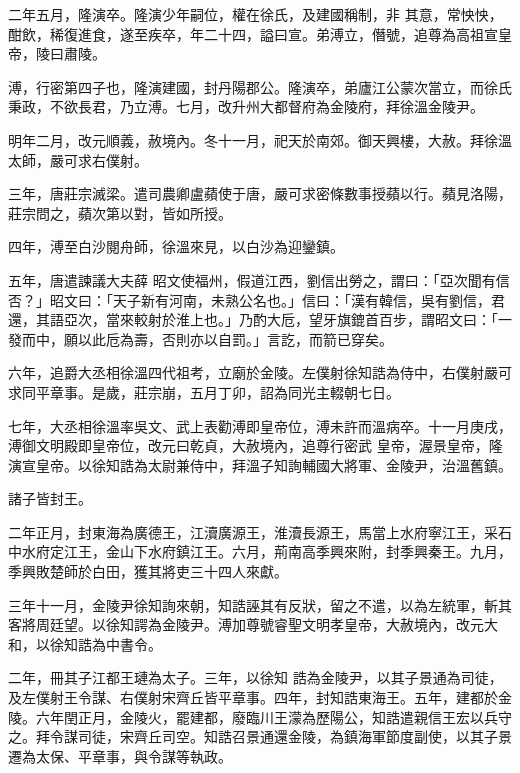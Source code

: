\begin{pinyinscope}
 二年五月，隆演卒。隆演少年嗣位，權在徐氏，及建國稱制，非
 其意，常怏怏，酣飲，稀復進食，遂至疾卒，年二十四，謚曰宣。弟溥立，僭號，追尊為高祖宣皇帝，陵曰肅陵。



 溥，行密第四子也，隆演建國，封丹陽郡公。隆演卒，弟廬江公蒙次當立，而徐氏秉政，不欲長君，乃立溥。七月，改升州大都督府為金陵府，拜徐溫金陵尹。



 明年二月，改元順義，赦境內。冬十一月，祀天於南郊。御天興樓，大赦。拜徐溫太師，嚴可求右僕射。



 三年，唐莊宗滅梁。遣司農卿盧蘋使于唐，嚴可求密條數事授蘋以行。蘋見洛陽，莊宗問之，蘋次第以對，皆如所授。



 四年，溥至白沙閱舟師，徐溫來見，以白沙為迎鑾鎮。



 五年，唐遣諫議大夫薛
 昭文使福州，假道江西，劉信出勞之，謂曰：「亞次聞有信否？」昭文曰：「天子新有河南，未熟公名也。」信曰：「漢有韓信，吳有劉信，君還，其語亞次，當來較射於淮上也。」乃酌大卮，望牙旗鎞首百步，謂昭文曰：「一發而中，願以此卮為壽，否則亦以自罰。」言訖，而箭已穿矣。



 六年，追爵大丞相徐溫四代祖考，立廟於金陵。左僕射徐知誥為侍中，右僕射嚴可求同平章事。是歲，莊宗崩，五月丁卯，詔為同光主輟朝七日。



 七年，大丞相徐溫率吳文、武上表勸溥即皇帝位，溥未許而溫病卒。十一月庚戌，溥御文明殿即皇帝位，改元曰乾貞，大赦境內，追尊行密武
 皇帝，渥景皇帝，隆演宣皇帝。以徐知誥為太尉兼侍中，拜溫子知詢輔國大將軍、金陵尹，治溫舊鎮。



 諸子皆封王。



 二年正月，封東海為廣德王，江瀆廣源王，淮瀆長源王，馬當上水府寧江王，采石中水府定江王，金山下水府鎮江王。六月，荊南高季興來附，封季興秦王。九月，季興敗楚師於白田，獲其將吏三十四人來獻。



 三年十一月，金陵尹徐知詢來朝，知誥誣其有反狀，留之不遣，以為左統軍，斬其客將周廷望。以徐知諤為金陵尹。溥加尊號睿聖文明孝皇帝，大赦境內，改元大和，以徐知誥為中書令。



 二年，冊其子江都王璉為太子。三年，以徐知
 誥為金陵尹，以其子景通為司徒，及左僕射王令謀、右僕射宋齊丘皆平章事。四年，封知誥東海王。五年，建都於金陵。六年閏正月，金陵火，罷建都，廢臨川王濛為歷陽公，知誥遣親信王宏以兵守之。拜令謀司徒，宋齊丘司空。知誥召景通還金陵，為鎮海軍節度副使，以其子景遷為太保、平章事，與令謀等執政。




\end{pinyinscope}
